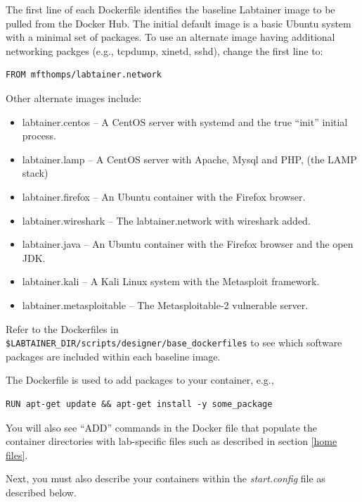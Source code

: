 \documentclass[12pt]{article}
\begin{document}
The first line of each Dockerfile identifies the baseline Labtainer image to be pulled from the Docker Hub.
The initial default image is a basic Ubuntu system with a minimal set of packages.  To use an
alternate image having additional networking packges (e.g., tcpdump, xinetd, sshd), change the first line to:
\begin{verbatim}
FROM mfthomps/labtainer.network
\end{verbatim}
\noindent Other alternate images include:
\begin{itemize}
\item labtainer.centos -- A CentOS server with systemd and the true ``init'' initial process.
\item labtainer.lamp -- A CentOS server with Apache, Mysql and PHP, (the LAMP stack)
\item labtainer.firefox -- An Ubuntu container with the Firefox browser.
\item labtainer.wireshark -- The labtainer.network with wireshark added.
\item labtainer.java -- An Ubuntu container with the Firefox browser and the open JDK.
\item labtainer.kali -- A Kali Linux system with the Metasploit framework.
\item labtainer.metasploitable -- The Metasploitable-2 vulnerable server.
\end{itemize}
Refer to the Dockerfiles in {\tt \$LABTAINER\_DIR/scripts/designer/base\_dockerfiles} to see which
software packages are included within each baseline image. 

The Dockerfile is used to add packages to your container, e.g., 
\begin{verbatim}
RUN apt-get update && apt-get install -y some_package
\end{verbatim}

You will also see ``ADD'' commands in the Docker file that populate the container
directories with lab-specific files such as described in section \ref{home files}.

Next, you must also describe your containers within the \textit{start.config} file as described below.
\end{document}
